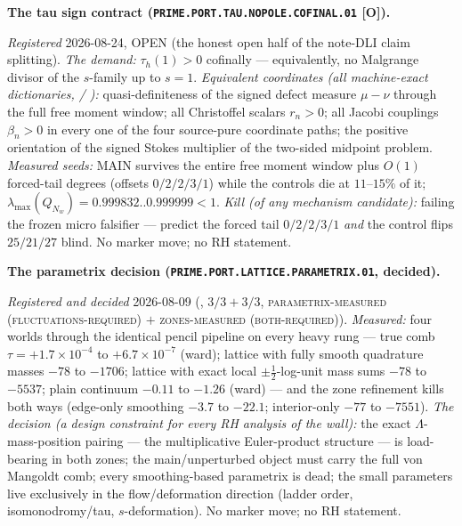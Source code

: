 \documentclass[11pt,a4paper]{article}
\begin{document}
\par\smallskip\noindent\textbf{The tau sign contract
(\texttt{PRIME.PORT.TAU.NOPOLE.\allowbreak COFINAL.01} [O]).}
{\sloppy
\emph{Registered} 2026-08-24, OPEN (the honest open half of the
note-DLI claim splitting).  \emph{The demand:} $\tau_h(1) > 0$
cofinally --- equivalently, no Malgrange divisor of the
$s$-family up to $s = 1$.  \emph{Equivalent coordinates (all
machine-exact dictionaries,
 /
):}
quasi-definiteness of the signed defect measure $\mu - \nu$
through the full free moment window; all Christoffel scalars
$r_n > 0$; all Jacobi couplings $\beta_n > 0$ in every one of
the four source-pure coordinate paths; the positive orientation
of the signed Stokes multiplier of the two-sided midpoint
problem.  \emph{Measured seeds:} MAIN survives the entire free
moment window plus $O(1)$ forced-tail degrees (offsets
$0/2/2/3/1$) while the controls die at $11$--$15\%$ of it;
$\lambda_{\max}(Q_{N_w}) = 0.999832..0.999999 < 1$.  \emph{Kill
(of any mechanism candidate):} failing the frozen micro
falsifier --- predict the forced tail $0/2/2/3/1$ \emph{and} the
control flips $25/21/27$ blind.  No marker move; no RH
statement.\par}

\par\smallskip\noindent\textbf{The parametrix decision
(\texttt{PRIME.PORT.LATTICE.\allowbreak PARAMETRIX.01},
decided).}
{\sloppy
\emph{Registered and decided} 2026-08-09
(, $3/3 + 3/3$,
\textsc{parametrix-measured (fluctuations-required)} $+$
\textsc{zones-measured (both-required)}).  \emph{Measured:}
four worlds through the identical pencil pipeline on every heavy
rung --- true comb $\tau = +1.7\times10^{-4}$ to
$+6.7\times10^{-7}$ (ward); lattice with fully smooth quadrature
masses $-78$ to $-1706$; lattice with exact local
$\pm\tfrac12$-log-unit mass sums $-78$ to $-5537$; plain
continuum $-0.11$ to $-1.26$ (ward) --- and the zone refinement
kills both ways (edge-only smoothing $-3.7$ to $-22.1$;
interior-only $-77$ to $-7551$).  \emph{The decision (a design
constraint for every RH analysis of the wall):} the exact
$\Lambda$-mass-position pairing --- the multiplicative
Euler-product structure --- is load-bearing in both zones; the
main/unperturbed object must carry the full von Mangoldt comb;
every smoothing-based parametrix is dead; the small parameters
live exclusively in the flow/deformation direction (ladder
order, isomonodromy/tau, $s$-deformation).  No marker move; no
RH statement.\par}
\end{document}
